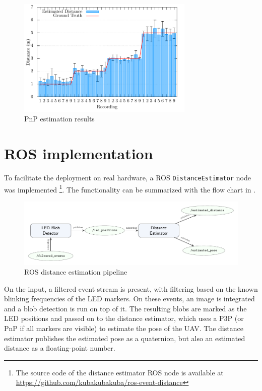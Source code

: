 \begin{figure}[H]
	\centering
	\includegraphics[width=0.75\textwidth]{./fig/tikz/pnp_results.pdf}
	\caption{PnP estimation results}
	\label{fig:pnpres}
\end{figure}

\section{ROS implementation}
To facilitate the deployment on real hardware, a \ac{ROS} \texttt{DistanceEstimator} node was implemented
\footnote{The source code of the distance estimator \ac{ROS} node is available at \url{https://github.com/kubakubakuba/ros-event-distance}}.
The functionality can be summarized with the flow chart
in
.
\begin{figure}[H]
	\centering
	\includegraphics[width=1.0\textwidth]{./fig/tikz/rosflow.pdf}
	\caption{ROS distance estimation pipeline}
	\label{fig:rosflow}
\end{figure}
On the input, a filtered event stream is present, with filtering based on the known blinking frequencies of the \ac{LED} markers.
On these events, an image is integrated and a blob detection is run on top of it. The resulting blobs are marked as the \ac{LED} positions and passed 
on to the distance estimator, which uses a \ac{P3P} (or \ac{PnP} if all markers are visible) to estimate the pose of the \ac{UAV}. The distance estimator publishes the estimated pose as a quaternion, but also an estimated distance as a floating-point number.